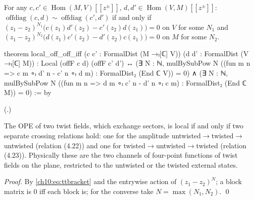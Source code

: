 \begin{theorem}\label{ch10:thm:offoff}
For any $c,c'\in\operatorname{Hom}(M,V)[[z^\pm]]$, $d,d'\in\operatorname{Hom}(V,M)[[z^\pm]]$:
$\operatorname{offdiag}(c,d)\sim\operatorname{offdiag}(c',d')$ if and only if
$(z_1-z_2)^{N_1}\bigl(c(z_1)d'(z_2)-c'(z_2)d(z_1)\bigr)=0$ on $V$ for some $N_1$ and
$(z_1-z_2)^{N_2}\bigl(d(z_1)c'(z_2)-d'(z_2)c(z_1)\bigr)=0$ on $M$ for some $N_2$.
\end{theorem}
\begin{leancode}
theorem local_off_off_iff (c c' : FormalDist (M →ₗ[ℂ] V)) (d d' : FormalDist (V →ₗ[ℂ] M)) :
    Local (offF c d) (offF c' d') ↔
      (∃ N : ℕ, mulBySubPow N
        ((fun m n => c m ∘ₗ d' n - c' n ∘ₗ d m) : FormalDist₂ (End ℂ V)) = 0) ∧
      (∃ N : ℕ, mulBySubPow N
        ((fun m n => d m ∘ₗ c' n - d' n ∘ₗ c m) : FormalDist₂ (End ℂ M)) = 0) := by
\end{leancode}
(.)

\begin{physics}
The OPE of two twist fields, which exchange sectors, is local if and only if two separate crossing relations hold: one for the amplitude untwisted$\to$twisted$\to$untwisted (relation (4.22)) and one for twisted$\to$untwisted$\to$twisted (relation (4.23)). Physically these are the two channels of four-point functions of twist fields on the plane, restricted to the untwisted or the twisted external states.
\end{physics}

\emph{Proof.} By \eqref{ch10:eq:ttbracket} and the entrywise action of $(z_1-z_2)^N$; a block
matrix is $0$ iff each block is; for the converse take $N=\max(N_1,N_2)$. \qed

